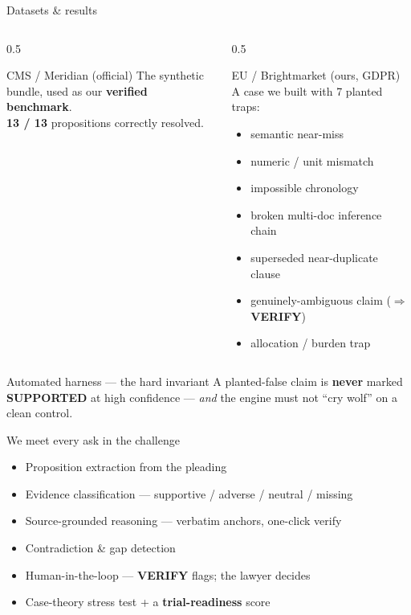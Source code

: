 \documentclass[aspectratio=169,10pt]{beamer}
\newcommand{\cmark}{\textcolor{goodgreen}{\ding{51}}}
\newcommand{\supported}{\textcolor{goodgreen}{\textbf{SUPPORTED}}}
\newcommand{\verify}{\textcolor{warnamber}{\textbf{VERIFY}}}
\begin{document}
\begin{frame}{Datasets \& results}
  \begin{columns}[T]
    \begin{column}{0.5\textwidth}
      \begin{block}{CMS / Meridian (official)}
        The synthetic bundle, used as our \textbf{verified benchmark}.\\[3pt]
        \cmark{} \textbf{13 / 13} propositions correctly resolved.
      \end{block}
    \end{column}
    \begin{column}{0.5\textwidth}
      \begin{block}{EU / Brightmarket (ours, GDPR)}
        A case we built with \alert{7 planted traps}:
        \begin{itemize}\footnotesize
          \item semantic near-miss
          \item numeric / unit mismatch
          \item impossible chronology
          \item broken multi-doc inference chain
          \item superseded near-duplicate clause
          \item genuinely-ambiguous claim ($\Rightarrow$ \verify{})
          \item allocation / burden trap
        \end{itemize}
      \end{block}
    \end{column}
  \end{columns}
  \medskip
  \begin{alertblock}{Automated harness --- the hard invariant}
    A planted-false claim is \textbf{never} marked \supported{} at high
    confidence --- \emph{and} the engine must not ``cry wolf'' on a clean
    control.
  \end{alertblock}
\end{frame}

\begin{frame}{We meet every ask in the challenge}
  \begin{itemize}
    \item \cmark{} Proposition extraction from the pleading
    \item \cmark{} Evidence classification --- supportive / adverse / neutral /
          missing
    \item \cmark{} Source-grounded reasoning --- verbatim anchors, one-click
          verify
    \item \cmark{} Contradiction \& gap detection
    \item \cmark{} Human-in-the-loop --- \verify{} flags; the lawyer decides
    \item \cmark{} Case-theory stress test + a \textbf{trial-readiness} score
  \end{itemize}
\end{frame}
\end{document}

